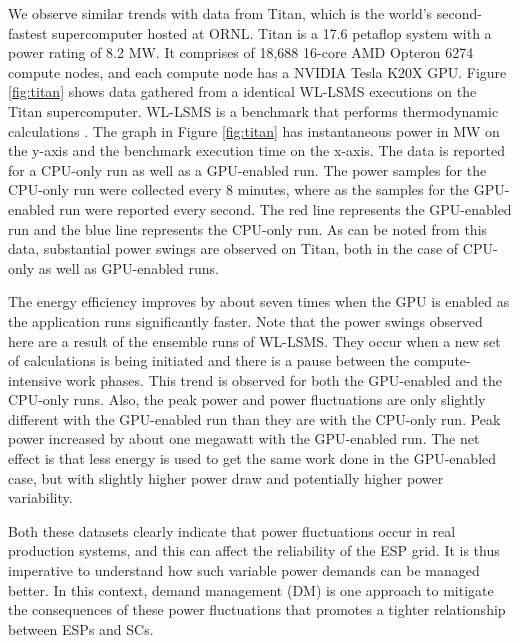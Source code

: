 We observe similar trends with data from Titan, which is the world's second-fastest supercomputer hosted at ORNL. Titan is a 17.6 petaflop system with a power rating of 8.2 MW. It comprises of 18,688 16-core AMD Opteron 6274 compute nodes, and each compute node has a NVIDIA Tesla K20X GPU. Figure \ref{fig:titan} shows data gathered from a identical WL-LSMS executions on the Titan supercomputer. WL-LSMS is a benchmark that performs thermodynamic calculations  \cite{WLLSMS}. The graph in Figure \ref{fig:titan} has instantaneous power in MW on the y-axis and the benchmark execution time on the x-axis. The data is reported for a CPU-only run as well as a GPU-enabled run. The power samples for the CPU-only run were collected every 8 minutes, where as the samples for the GPU-enabled run were reported every second. The red line represents the GPU-enabled run and the blue line represents the CPU-only run.  As can be noted from this data, substantial power swings are observed on Titan, both in the case of CPU-only as well as GPU-enabled runs. 

The energy efficiency improves by about seven times when the GPU is enabled as the application runs significantly faster. Note that the power swings observed here are a result of the ensemble runs of WL-LSMS. They occur when a new set of calculations is being initiated and there is a pause between the compute-intensive work phases. This trend is observed for both the GPU-enabled and the CPU-only runs. Also, the peak power and power fluctuations are only slightly different with the GPU-enabled run than they are with the CPU-only run. Peak power increased by about one megawatt with the GPU-enabled run. The net effect is that less energy is used to get the same work done in the GPU-enabled case, but with slightly higher power draw and potentially higher power variability.

Both these datasets clearly indicate that power fluctuations occur in real production systems, and this can affect the reliability of the ESP grid. It is thus imperative to understand how such variable power demands can be managed better. In this context, demand management (DM) is one approach to mitigate the consequences of these power fluctuations that promotes a tighter relationship between ESPs and SCs. %

